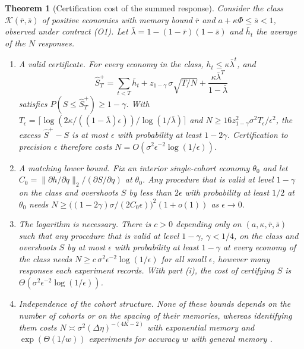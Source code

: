\documentclass[12pt]{article}
\newtheorem{theorem}{Theorem}[section]
\theoremstyle{definition}
\theoremstyle{remark}
\begin{document}
\begin{theorem}[Certification cost of the summed response]\label{thm:certcost}
Consider the class $\mathcal K(\bar r,\bar s)$ of positive economies with memory bound $\bar r$ and $a+\kappa\Phi\le\bar s<1$, observed under contract (O1). Let $\bar\lambda=1-(1-\bar r)(1-\bar s)$ and $\bar h_t$ the average of the $N$ responses.
\begin{enumerate}[label=(\roman*)]
\item \emph{A valid certificate.} For every economy in the class, $h_t\le\kappa\bar\lambda^t$, and
\[
\hat S^+_T=\sum_{t<T}\bar h_t+z_{1-\gamma}\,\sigma\sqrt{T/N}+\frac{\kappa\bar\lambda^T}{1-\bar\lambda}
\]
satisfies $P(S\le\hat S^+_T)\ge1-\gamma$. With $T_\epsilon=\lceil\log(2\kappa/((1-\bar\lambda)\epsilon))/\log(1/\bar\lambda)\rceil$ and $N\ge16z_{1-\gamma}^2\sigma^2T_\epsilon/\epsilon^2$, the excess $\hat S^+-S$ is at most $\epsilon$ with probability at least $1-2\gamma$. Certification to precision $\epsilon$ therefore costs $N=O(\sigma^2\epsilon^{-2}\log(1/\epsilon))$.
\item \emph{A matching lower bound.} Fix an interior single-cohort economy $\theta_0$ and let $C_0=\|\partial h/\partial q\|_2/(\partial S/\partial q)$ at $\theta_0$. Any procedure that is valid at level $1-\gamma$ on the class and overshoots $S$ by less than $2\epsilon$ with probability at least $1/2$ at $\theta_0$ needs $N\ge\bigl((1-2\gamma)\sigma/(2C_0\epsilon)\bigr)^2(1+o(1))$ as $\epsilon\to0$.
\item \emph{The logarithm is necessary.} There is $c>0$ depending only on $(a,\kappa,\bar r,\bar s)$ such that any procedure that is valid at level $1-\gamma$, $\gamma<1/4$, on the class and overshoots $S$ by at most $\epsilon$ with probability at least $1-\gamma$ at every economy of the class needs $N\ge c\,\sigma^2\epsilon^{-2}\log(1/\epsilon)$ for all small $\epsilon$, however many responses each experiment records. With part (i), the cost of certifying $S$ is $\Theta(\sigma^2\epsilon^{-2}\log(1/\epsilon))$.
\item \emph{Independence of the cohort structure.} None of these bounds depends on the number of cohorts or on the spacing of their memories, whereas identifying them costs $N\asymp\sigma^2(\Delta\eta)^{-(4K-2)}$ with exponential memory and $\exp(\Theta(1/w))$ experiments for accuracy $w$ with general memory \citep{niroula2026}.
\end{enumerate}
\end{theorem}
\end{document}
